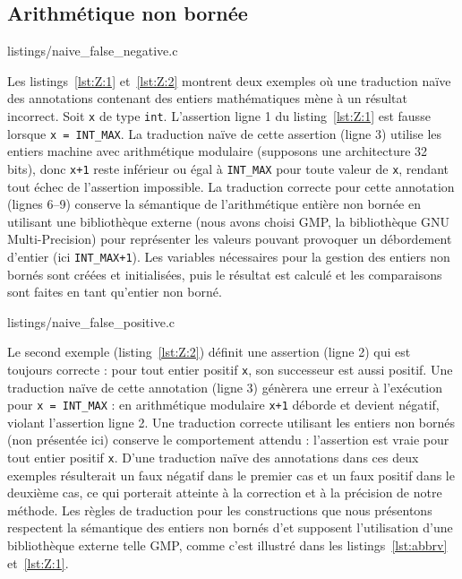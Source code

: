 \subsection{Arithmétique non bornée}
\label{sec:integers}



                {listings/naive_false_negative.c}


Les listings~\ref{lst:Z:1} et~\ref{lst:Z:2} montrent deux exemples où
une traduction naïve des annotations contenant des entiers mathématiques mène
à un résultat incorrect.
Soit \lstinline'x' de type \lstinline'int'.
L'assertion ligne 1 du listing~\ref{lst:Z:1} est fausse lorsque
\lstinline'x = INT_MAX'.
La traduction naïve de cette assertion (ligne 3) utilise les entiers machine
avec arithmétique modulaire (supposons une architecture 32 bits), donc
\lstinline'x+1' reste inférieur ou égal à \lstinline'INT_MAX' pour toute valeur
de \lstinline'x', rendant tout échec de l'assertion impossible.
La traduction correcte pour cette annotation (lignes 6--9) conserve la
sémantique de l'arithmétique entière non bornée en utilisant une bibliothèque
externe (nous avons choisi GMP, la bibliothèque GNU Multi-Precision) pour
représenter les valeurs pouvant provoquer un débordement d'entier (ici
\lstinline'INT_MAX+1').
Les variables nécessaires pour la gestion des entiers non bornés sont créées et
initialisées, puis le résultat est calculé et les comparaisons sont faites en
tant qu'entier non borné.


                {listings/naive_false_positive.c}

Le second exemple (listing~\ref{lst:Z:2}) définit une assertion \eacsl (ligne 2)
qui est toujours correcte : pour tout entier positif \lstinline'x', son
successeur est aussi positif.
Une traduction naïve de cette annotation (ligne 3) génèrera une erreur à
l'exécution pour \lstinline'x = INT_MAX' : en arithmétique modulaire
\lstinline'x+1' déborde et devient négatif, violant l'assertion ligne 2.
Une traduction correcte utilisant les entiers non bornés (non présentée ici)
conserve le comportement attendu : l'assertion est vraie pour tout entier
positif \lstinline'x'.
D'une traduction naïve des annotations dans ces deux exemples résulterait un
faux négatif dans le premier cas et un faux positif dans le deuxième cas, ce
qui porterait atteinte à la correction et à la précision de notre méthode.
Les règles de traduction pour les constructions \eacsl que nous présentons
respectent la sémantique des entiers non bornés d'\eacsl et supposent
l'utilisation d'une bibliothèque externe telle GMP, comme c'est illustré dans
les listings~\ref{lst:abbrv} et~\ref{lst:Z:1}.


